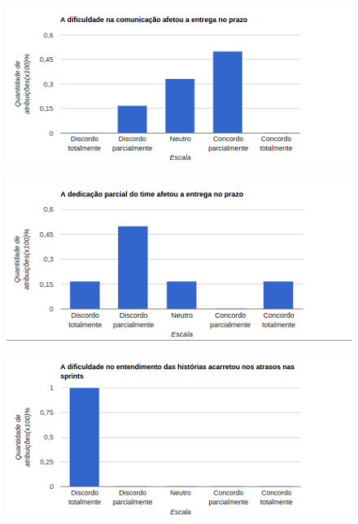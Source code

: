 \begin{apendicesenv}
			\begin{figure}[!htb]
			\center
			\includegraphics[scale=0.9]{figuras/grafico_6.png}
			\end{figure}

			\begin{figure}[!htb]
			\center
			\includegraphics[scale=0.9]{figuras/grafico_7.png}
			\end{figure}
			
			\begin{figure}[!htb]
			\center
			\includegraphics[scale=0.9]{figuras/grafico_8.png}
			\end{figure}

\end{apendicesenv}
